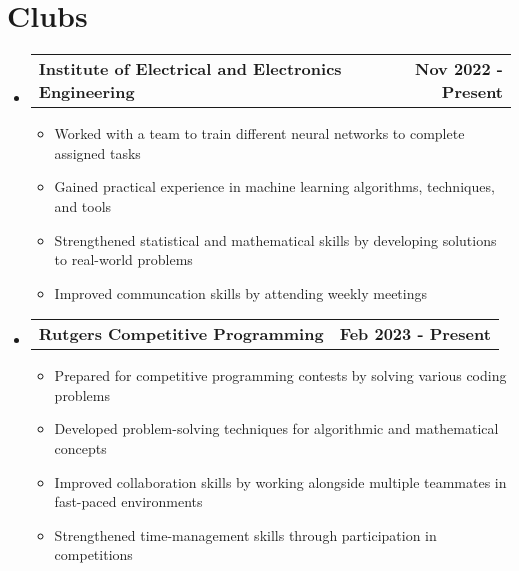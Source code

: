 \documentclass[letterpaper,11pt]{article}
\makeatletter
\newcommand{\resumeItem}[1]{
  \item\small{
    {#1 \vspace{-2pt}}
  }
}
\newcommand{\resumeProjectHeading}[2]{
    \item
    \begin{tabular*}{0.97\textwidth}{l@{\extracolsep{\fill}}r}
      \small#1 & #2 \\
    \end{tabular*}\vspace{-7pt}
}
\newcommand{\resumeSubHeadingListStart}{\begin{itemize}[leftmargin=0.15in, label={}]}
\newcommand{\resumeSubHeadingListEnd}{\end{itemize}}
\newcommand{\resumeItemListStart}{\begin{itemize}}
\newcommand{\resumeItemListEnd}{\end{itemize}\vspace{-3pt}}
\makeatother
\begin{document}
\section{Clubs}
    \resumeSubHeadingListStart
      \resumeProjectHeading
          {\textbf{Institute of Electrical and Electronics Engineering}}{\textbf{Nov 2022 - Present}}
          \resumeItemListStart
            \resumeItem{Worked with a team to train different neural networks to complete assigned tasks}
            \resumeItem{Gained practical experience in machine learning algorithms, techniques, and tools}
            \resumeItem{Strengthened statistical and mathematical skills by developing solutions to real-world problems}
            \resumeItem{Improved communcation skills by attending weekly meetings}
          \resumeItemListEnd
      \resumeProjectHeading
          {\textbf{Rutgers Competitive Programming}}{\textbf{Feb 2023 - Present}}
          \resumeItemListStart
            \resumeItem{Prepared for competitive programming contests by solving various coding problems}
            \resumeItem{Developed problem-solving techniques for algorithmic and mathematical concepts}
            \resumeItem{Improved collaboration skills by working alongside multiple teammates in fast-paced environments}
            \resumeItem{Strengthened time-management skills through participation in competitions}
        \resumeItemListEnd
    \resumeSubHeadingListEnd


\end{document}
